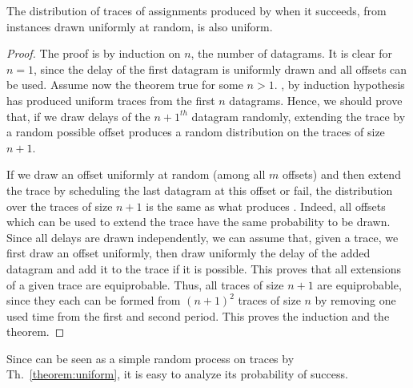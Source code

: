 \begin{theorem}
The distribution of traces of assignments produced by \greedyuniform when it succeeds, from instances drawn uniformly at random, is also uniform.
\end{theorem}
\begin{proof}
The proof is by induction on $n$, the number of datagrams. It is clear for $n=1$,
since the delay of the first datagram is uniformly drawn and all offsets can be used.
Assume now the theorem true for some $n>1$. \greedyuniform, by induction hypothesis has produced
uniform traces from the first $n$ datagrams.  Hence, we should prove that, if we draw delays
of the $n+1^{th}$ datagram randomly, extending the trace by a random possible offset produces a random distribution on the traces of size $n+1$. 

 If we draw an offset uniformly at random (among all $m$ offsets) and then extend the trace by scheduling the last datagram at this offset or fail, the distribution over the traces of size $n+1$ is the same as what produces \greedyuniform. Indeed, all offsets which can be used to extend the trace have the same probability to be drawn. Since all delays are drawn independently, we can assume that, given a trace, we first draw an offset uniformly, then draw uniformly the delay of the added datagram and add it to the trace if it is possible. This proves that all extensions of a given trace are equiprobable. Thus, all traces of size $n+1$ are equiprobable, since they each can be formed from $(n+1)^2$ traces of size $n$ by removing one used time from the first and second period. This proves the induction and the theorem.
\end{proof}

Since \greedyuniform can be seen as a simple random process on traces by Th.~\ref{theorem:uniform}, it is easy to analyze its probability of success.

